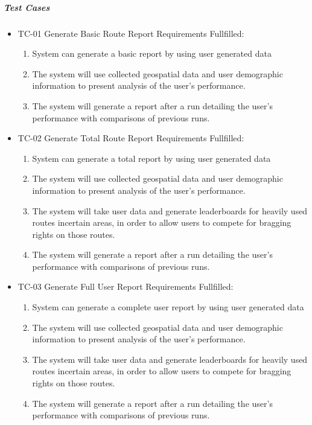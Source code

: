 \documentclass{article}
\begin{document}
\subparagraph{Test Cases}
\begin{itemize}
\item TC-01 Generate Basic Route Report
	\subitem Requirements Fullfilled:
	\begin{enumerate}
		\item System can generate a basic report by using user generated data
		\item The system will use collected geospatial data and user demographic information to present analysis of the user’s performance.
		\item The system will generate a report after a run detailing the user’s performance with comparisons of previous runs.
	\end{enumerate}
\item TC-02 Generate Total Route Report
	\subitem Requirements Fullfilled:
	\begin{enumerate}
		\item System can generate a total report by using user generated data
		\item The system will use collected geospatial data and user demographic information to present analysis of the user’s performance.
		\item The system will take user data and generate leaderboards for heavily used routes incertain areas, in order to allow users to compete for bragging rights on those routes.
		\item The system will generate a report after a run detailing the user’s performance with comparisons of previous runs.
	\end{enumerate}
\item TC-03 Generate Full User Report
	\subitem Requirements Fullfilled:
	\begin{enumerate}
		\item System can generate a complete user report by using user generated data
		\item The system will use collected geospatial data and user demographic information to present analysis of the user’s performance.
		\item The system will take user data and generate leaderboards for heavily used routes incertain areas, in order to allow users to compete for bragging rights on those routes.
		\item The system will generate a report after a run detailing the user’s performance with comparisons of previous runs.
	\end{enumerate}
\end{itemize}
\end{document}
